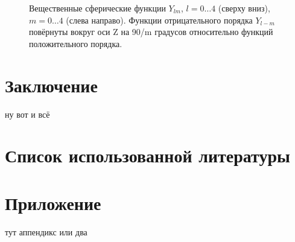 \documentclass[14pt,a4paper,russian]{article}
\begin{document}
\begin{figure}[h!]
\caption{Вещественные сферические функции $Y_{lm}$, $l=0…4$ (сверху вниз), $m=0…4$ (слева направо). Функции отрицательного порядка $Y_{l-m}$ повёрнуты вокруг оси Z на 90/m градусов относительно функций положительного порядка.}
\label{img:sf}
\end{figure}



\section{Заключение}\label{conclusion}
		ну вот и всё \cite{book:fourier} 

\newpage
\section{Список использованной литературы}\label{conclusionlit}
%
%
\printbibliography[type=online,title={Online only}]
\printbibliography[type=book,title={Статьи:}]


\appendix

\section*{Приложение}
тут аппендикс или два 
\end{document}
